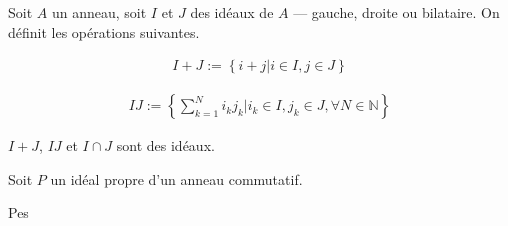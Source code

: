 \begin{defn}
Soit $A$ un anneau, soit $I$ et $J$ des idéaux de $A$ --- gauche, droite ou bilataire. On définit les opérations suivantes.

\begin{align*}
I+J:=\left\{i+j | i\in I, j\in J\right\}
\end{align*}

\begin{align*}
IJ:=\left\{\sum\limits_{k=1}^N i_kj_k | i_k\in I, j_k\in J, \forall N\in\mathbb{N}\right\}
\end{align*}

$I+J$, $IJ$ et $I\cap J$ sont des idéaux.
\end{defn}

\begin{thm}
Soit $P$ un idéal propre d'un anneau  commutatif.

Pes
\end{thm}